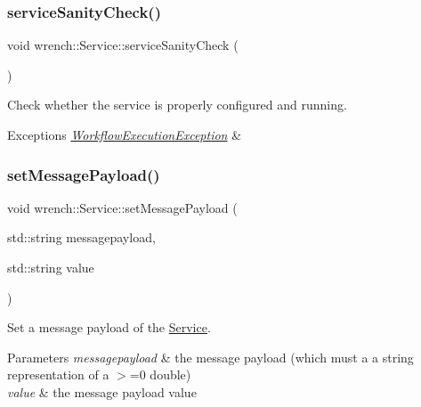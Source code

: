 \subsubsection{\texorpdfstring{service\+Sanity\+Check()}{serviceSanityCheck()}}
{\footnotesize\ttfamily void wrench\+::\+Service\+::service\+Sanity\+Check (\begin{DoxyParamCaption}{ }\end{DoxyParamCaption})\hspace{0.3cm}{\ttfamily [protected]}}



Check whether the service is properly configured and running. 


\begin{DoxyExceptions}{Exceptions}
{\em \hyperlink{classwrench_1_1_workflow_execution_exception}{Workflow\+Execution\+Exception}} & \\
\hline
\end{DoxyExceptions}
\mbox{\label{classwrench_1_1_service_ae1d174ad9e50cd3d7cc2cf2863a2bb65}} 
\subsubsection{\texorpdfstring{set\+Message\+Payload()}{setMessagePayload()}}
{\footnotesize\ttfamily void wrench\+::\+Service\+::set\+Message\+Payload (\begin{DoxyParamCaption}\item[{std\+::string}]{messagepayload,  }\item[{std\+::string}]{value }\end{DoxyParamCaption})\hspace{0.3cm}{\ttfamily [protected]}}



Set a message payload of the \hyperlink{classwrench_1_1_service}{Service}. 


\begin{DoxyParams}{Parameters}
{\em messagepayload} & the message payload (which must a a string representation of a $>$=0 double) \\
\hline
{\em value} & the message payload value \\
\hline
\end{DoxyParams}

